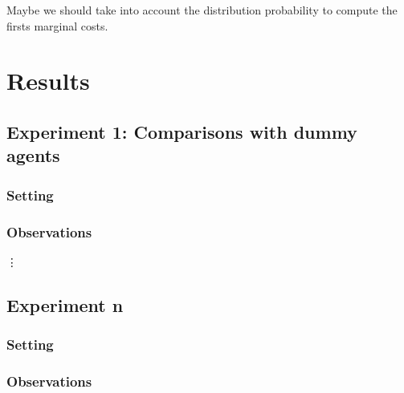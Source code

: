 \documentclass[11pt]{article}
\begin{document}
Maybe we should take into account the distribution probability to compute the firsts marginal costs.


\section{Results}

\subsection{Experiment 1: Comparisons with dummy agents}

\subsubsection{Setting}

\subsubsection{Observations}

\vdots

\subsection{Experiment n}

\subsubsection{Setting}

\subsubsection{Observations}
\end{document}

